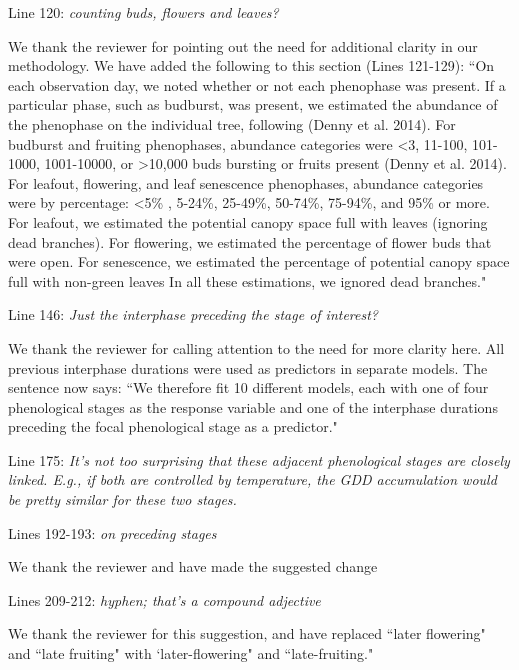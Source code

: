 \documentclass[10.95pt,a4paper]{letter}
\begin{document}
\par Line 120: \emph{counting buds, flowers and leaves?}

\par We thank the reviewer for pointing out the need for additional clarity in our methodology. We have added the following to this section (Lines 121-129): ``On each observation day, we noted whether or not each phenophase was present. If a particular phase, such as budburst, was present, we estimated the abundance of the phenophase on the individual tree, following (Denny et al. 2014). For budburst and fruiting phenophases, abundance categories were \textless 3, 11-100, 101-1000, 1001-10000, or \textgreater 10,000 buds bursting or fruits present (Denny et al. 2014). For leafout, flowering, and leaf senescence phenophases, abundance categories were by percentage: \textless 5\% , 5-24\%, 25-49\%, 50-74\%, 75-94\%, and 95\%  or more. For leafout, we estimated the potential canopy space full with leaves (ignoring dead branches). For flowering, we estimated the percentage of flower buds that were open. For senescence, we estimated the percentage of potential canopy space full with non-green leaves In all these estimations, we ignored dead branches."

\par Line 146:  \emph{Just the interphase preceding the stage of interest?}
\par We thank the reviewer for calling attention to the need for more clarity here. All previous interphase durations were used as predictors in separate models. The sentence now says:
``We therefore fit 10 different models, each with one of four phenological stages as the response variable and one of the interphase durations preceding the focal phenological stage as a predictor."
\par Line 175: \emph{It's not too surprising that these adjacent phenological stages are closely linked. E.g.,  if both are controlled by temperature, the GDD accumulation would be pretty similar for these two stages.} 

\par Lines 192-193: \emph{on preceding stages}
\par We thank the reviewer and have made the suggested change
 
\par Lines 209-212: \emph{hyphen; that's a compound adjective}
\par We thank the reviewer for this suggestion, and have replaced ``later flowering" and ``late fruiting" with `later-flowering" and ``late-fruiting." 
\end{document}
